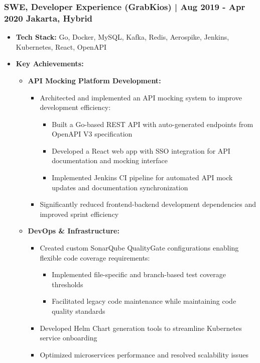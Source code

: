 \documentclass[11pt]{article}
\begin{document}
\subsubsection{SWE, Developer Experience (GrabKios) | Aug 2019 - Apr 2020 \hfill Jakarta, Hybrid}
\begin{itemize}
    \item \textbf{Tech Stack:} Go, Docker, MySQL, Kafka, Redis, Aerospike, Jenkins, Kubernetes, React, OpenAPI
    \item \textbf{Key Achievements:}
    \begin{itemize}
        \item \textbf{API Mocking Platform Development:}
        \begin{itemize}
            \item Architected and implemented an API mocking system to improve development efficiency:
            \begin{itemize}
                \item Built a Go-based REST API with auto-generated endpoints from OpenAPI V3 specification
                \item Developed a React web app with SSO integration for API documentation and mocking interface
                \item Implemented Jenkins CI pipeline for automated API mock updates and documentation synchronization
            \end{itemize}
            \item Significantly reduced frontend-backend development dependencies and improved sprint efficiency
        \end{itemize}
        \item \textbf{DevOps \& Infrastructure:}
        \begin{itemize}
            \item Created custom SonarQube QualityGate configurations enabling flexible code coverage requirements:
            \begin{itemize}
                \item Implemented file-specific and branch-based test coverage thresholds
                \item Facilitated legacy code maintenance while maintaining code quality standards
            \end{itemize}
            \item Developed Helm Chart generation tools to streamline Kubernetes service onboarding
            \item Optimized microservices performance and resolved scalability issues

\end{itemize}
\end{itemize}
\end{itemize}
\end{document}
